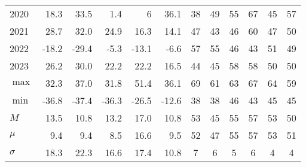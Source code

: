 \documentclass{article}
\begin{document}
\begin{table}[!ht]
\begin{tabular}{l || rrr || rr || cc||cc||cc}
        2020 & 18.3 & \cellcolor{green!25}33.5 & \cellcolor{red!25}1.4 & 6 & \cellcolor{green!25}36.1 & 38 & \cellcolor{green!25}49 & 55 & \cellcolor{green!25}67 & 45 & \cellcolor{green!25}57 \\ 
        2021 & 28.7 & \cellcolor{green!25}32.0 & \cellcolor{red!25}24.9 & \cellcolor{green!25}16.3 & 14.1 & \cellcolor{green!25}47 & 43 & 46 & \cellcolor{green!25}60 & 47 & \cellcolor{green!25}50 \\ 
        2022 & -18.2 & \cellcolor{red!25}-29.4 & \cellcolor{green!25}-5.3 & -13.1 & \cellcolor{green!25}-6.6 & \cellcolor{green!25}57 & 55 & \cellcolor{green!25}46 & 43 & \cellcolor{green!25}51 & 49 \\ 
        2023 & 26.2 & \cellcolor{green!25}30.0 & \cellcolor{red!25}22.2 & \cellcolor{green!25}22.2 & 16.5 & 44 & \cellcolor{green!25}45 & \cellcolor{green!25}58 & \cellcolor{green!25}58 & \cellcolor{green!25}50 & \cellcolor{green!25}50 \\ \hline
        $\max$ & 32.3 & \cellcolor{green!25}37.0 & \cellcolor{red!25}31.8 & \cellcolor{green!25}51.4 & 36.1 & \cellcolor{green!25}69 & 61 & 63 & \cellcolor{green!25}67 & \cellcolor{green!25}64 & 59 \\ 
        $\min$ & -36.8 & \cellcolor{red!25}-37.4 & \cellcolor{green!25}-36.3 & -26.5 & \cellcolor{green!25}-12.6 & \cellcolor{green!25}38 & \cellcolor{green!25}38 & \cellcolor{green!25}46 & 43 & \cellcolor{green!25}45 & \cellcolor{green!25}45 \\ 
        $M$ & \cellcolor{green!25}13.5 & \cellcolor{red!25}10.8 & 13.2 & \cellcolor{green!25}17.0 & 10.8 & \cellcolor{green!25}53 & 45 & 55 & \cellcolor{green!25}57 & \cellcolor{green!25}53 & 50 \\ 
        $\mu$ & \cellcolor{green!25}9.4 & \cellcolor{green!25}9.4 & \cellcolor{red!25}8.5 & \cellcolor{green!25}16.6 & 9.5 & \cellcolor{green!25}52 & 47 & 55 & \cellcolor{green!25}57 & \cellcolor{green!25}53 & 51 \\ 
        $\sigma$ & 18.3 & \cellcolor{green!25}22.3 & \cellcolor{red!25}16.6 & \cellcolor{green!25}17.4 & 10.8 & \cellcolor{green!25}7 & 6 & 5 & \cellcolor{green!25}6 & \cellcolor{green!25}4 & \cellcolor{green!25}4 \\ 

\hline
    \end{tabular}
    \label{tab:comparison_returns_ml_metrics}


  
\end{table}
\end{document}

